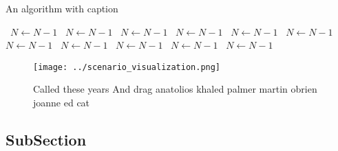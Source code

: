 \documentclass[a4paper]{article}
\begin{document}
\begin{algorithm}
\caption{An algorithm with caption}
\begin{algorithmic}
\    \State $N \gets N - 1$
\    \State $N \gets N - 1$
\    \State $N \gets N - 1$
\    \State $N \gets N - 1$
\    \State $N \gets N - 1$
\    \State $N \gets N - 1$
\    \State $N \gets N - 1$
\    \State $N \gets N - 1$
\    \State $N \gets N - 1$
\    \State $N \gets N - 1$
\    \State $N \gets N - 1$
\EndWhile
\end{algorithmic}
\end{algorithm}

\begin{figure}
\centering
\texttt{[image: ../scenario\_visualization.png]}
\caption{Called these years And drag anatolios khaled palmer martin obrien joanne ed cat
}
\end{figure}
 
\subsection{SubSection}
\end{document}
